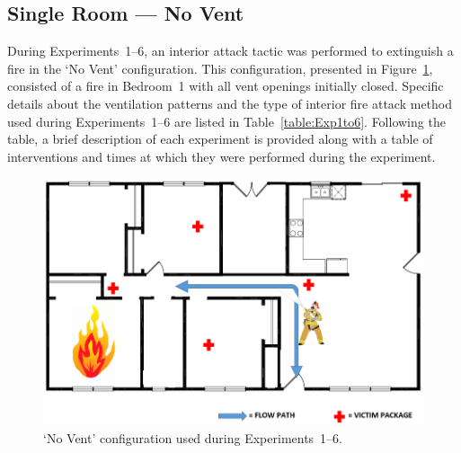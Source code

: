 \documentclass[12pt,oneside]{book}
\begin{document}
\subsection{Single Room --- No Vent}

During Experiments~1--6, an interior attack tactic was performed to extinguish a fire in the `No Vent' configuration. This configuration, presented in Figure~\ref{fig:No_Vent_int}, consisted of a fire in Bedroom~1 with all vent openings initially closed. Specific details about the ventilation patterns and the type of interior fire attack method used during Experiments~1--6 are listed in Table~\ref{table:Exp1to6}. Following the table, a brief description of each experiment is provided along with a table of interventions and times at which they were performed during the experiment.  

\begin{figure}[!ht]
	\centering
	\includegraphics[width=5in]{Figures/General/No_Vent_interior_config}
	\caption{`No Vent' configuration used during Experiments~1--6.}
	\label{fig:No_Vent_int}
\end{figure}
\end{document}
